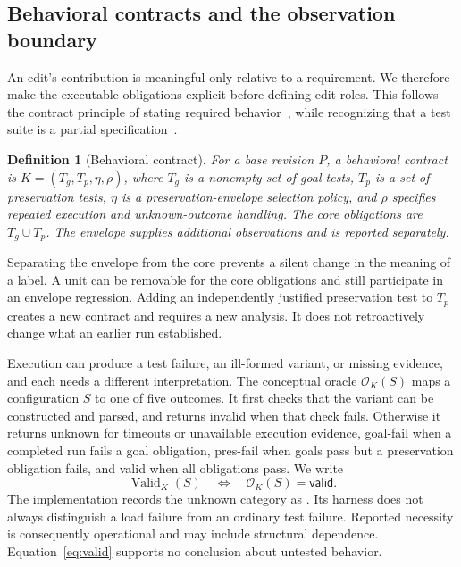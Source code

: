 \documentclass[a4paper,fleqn]{cas-sc}
\newcommand{\code}[1]{\texttt{\detokenize{#1}}}
\newcommand{\lab}[1]{\textsf{#1}}
\newcommand{\Valid}{\operatorname{Valid}}
\newtheorem{definition}{Definition}
\begin{document}
\subsection{Behavioral contracts and the observation boundary}\label{sec:contracts}

An edit's contribution is meaningful only relative to a requirement. We therefore make the executable obligations explicit before defining edit roles. This follows the contract principle of stating required behavior~\citep{meyer1992dbc}, while recognizing that a test suite is a partial specification~\citep{barr2015oracle}.

\begin{definition}[Behavioral contract]\label{def:contract}
For a base revision $P$, a behavioral contract is $K=(T_g,T_p,\eta,\rho)$, where $T_g$ is a nonempty set of goal tests, $T_p$ is a set of preservation tests, $\eta$ is a preservation-envelope selection policy, and $\rho$ specifies repeated execution and unknown-outcome handling. The core obligations are $T_g\cup T_p$. The envelope supplies additional observations and is reported separately.
\end{definition}

Separating the envelope from the core prevents a silent change in the meaning of a label. A unit can be removable for the core obligations and still participate in an envelope regression. Adding an independently justified preservation test to $T_p$ creates a new contract and requires a new analysis. It does not retroactively change what an earlier run established.

Execution can produce a test failure, an ill-formed variant, or missing evidence, and each needs a different interpretation. The conceptual oracle $\mathcal{O}_K(S)$ maps a configuration $S$ to one of five outcomes. It first checks that the variant can be constructed and parsed, and returns \lab{invalid} when that check fails. Otherwise it returns \lab{unknown} for timeouts or unavailable execution evidence, \lab{goal-fail} when a completed run fails a goal obligation, \lab{pres-fail} when goals pass but a preservation obligation fails, and \lab{valid} when all obligations pass. We write
\begin{equation}
\Valid_K(S)\quad\Longleftrightarrow\quad\mathcal{O}_K(S)=\lab{valid}.
\label{eq:valid}
\end{equation}
The implementation records the unknown category as \code{error}. Its harness does not always distinguish a load failure from an ordinary test failure. Reported necessity is consequently operational and may include structural dependence. Equation~\ref{eq:valid} supports no conclusion about untested behavior.
\end{document}
